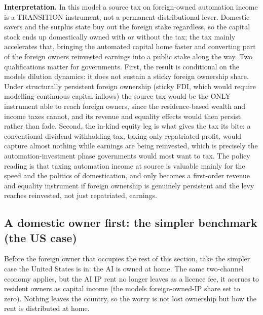 \documentclass[12pt]{article}
\begin{document}
\textbf{Interpretation.} In this model a source tax on foreign-owned
automation income is a TRANSITION instrument, not a permanent
distributional lever. Domestic savers and the surplus state buy out the
foreign stake regardless, so the capital stock ends up domestically
owned with or without the tax; the tax mainly accelerates that, bringing
the automated capital home faster and converting part of the foreign
owners\textquotesingle{} reinvested earnings into a public stake along
the way. Two qualifications matter for governments. First, the result is
conditional on the model\textquotesingle s dilution dynamics: it does
not sustain a sticky foreign ownership share. Under structurally
persistent foreign ownership (sticky FDI, which would require modelling
continuous capital inflows) the source tax would be the ONLY instrument
able to reach foreign owners, since the residence-based wealth and
income taxes cannot, and its revenue and equality effects would then
persist rather than fade. Second, the in-kind equity leg is what gives
the tax its bite: a conventional dividend withholding tax, taxing only
repatriated profit, would capture almost nothing while earnings are
being reinvested, which is precisely the automation-investment phase
governments would most want to tax. The policy reading is that taxing
automation income at source is valuable mainly for the speed and the
politics of domestication, and only becomes a first-order revenue and
equality instrument if foreign ownership is genuinely persistent and the
levy reaches reinvested, not just repatriated, earnings.

\hypertarget{a-domestic-owner-first-the-simpler-benchmark-the-us-case}{%
\subsection{A domestic owner first: the simpler benchmark (the US
case)}\label{a-domestic-owner-first-the-simpler-benchmark-the-us-case}}

Before the foreign owner that occupies the rest of this section, take
the simpler case the United States is in: the AI is owned at home. The
same two-channel economy applies, but the AI IP rent no longer leaves as
a licence fee, it accrues to resident owners as capital income (the
model\textquotesingle s foreign-owned-IP share set to zero). Nothing
leaves the country, so the worry is not lost ownership but how the rent
is distributed at home.
\end{document}
